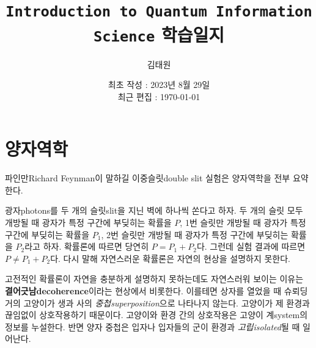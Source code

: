 \documentclass[a4paper,chapter,atbegshi]{oblivoir}
\title{\texttt{Introduction to Quantum Information Science} 학습일지}
\author{김태원}
\date{최초 작성 : 2023년 8월 29일 \\ 최근 편집 : \today}
\begin{document}
\maketitle
\break
\tableofcontents
\chapter{양자역학}
파인만{\tiny Richard Feynman}이 말하길 이중슬릿{\tiny double slit} 실험은
양자역학을 전부 요약한다. 

광자{\tiny photons}를 두 개의 슬릿{\tiny slit}을 지닌 벽에 하나씩 쏜다고 하자.
두 개의 슬릿 모두 개방될 때 광자가 특정 구간에 부딪히는 확률을 $P$, 1번 슬릿만
개방될 때 광자가 특정 구간에 부딪히는 확률을 $P_1$, 2번 슬릿만 개방될 때 광자가
특정 구간에 부딪히는 확률을 $P_2$라고 하자. 확률론에 따르면 당연히 $P=P_1+P_2$다.
그런데 실험 결과에 따르면 $P\neq P_1+P_2$다. 다시 말해 자연스러운 확률론은 자연의 
현상을 설명하지 못한다.

고전적인 확률론이 자연을 충분하게 설명하지 못하는데도 자연스러워 보이는 이유는 
\textbf{결어긋남\tiny decoherence}이라는 현상에서 비롯한다. 이를테면 상자를
열었을 때 슈뢰딩거의 고양이가 생과 사의 \emph{중첩\tiny superposition}으로
나타나지 않는다. 고양이가 제 환경과 끊임없이 상호작용하기 때문이다. 고양이와
환경 간의 상호작용은 고양이 계{\tiny system}의 정보를 누설한다. 반면 양자
중첩은 입자나 입자들의 군이 환경과 \emph{고립\tiny isolated}될 때 일어난다.
\end{document}
